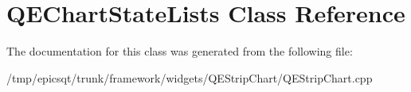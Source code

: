 \hypertarget{classQEChartStateLists}{
\section{QEChartStateLists Class Reference}
\label{classQEChartStateLists}
}


The documentation for this class was generated from the following file:\begin{DoxyCompactItemize}
\item 
/tmp/epicsqt/trunk/framework/widgets/QEStripChart/QEStripChart.cpp\end{DoxyCompactItemize}
